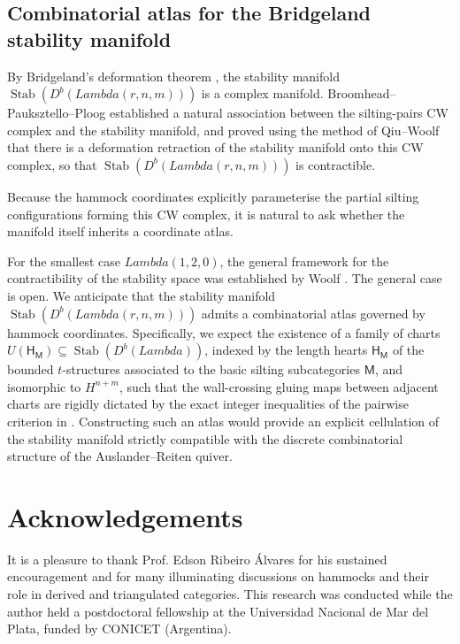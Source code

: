 \documentclass[11pt, a4paper]{article}
\theoremstyle{definition}
\def\Lambda{Lambda}%
\def\mathbb#1{#1}%
\def\mathcal#1{#1}%
\def\Db{D^b}%
\newcommand{\Db}{\mathcal{D}^b}
\begin{document}
\subsection{Combinatorial atlas for the Bridgeland stability manifold}
\label{subsec:future-stability}

By Bridgeland's deformation theorem \cite{Bridgeland2007}, the stability manifold $\operatorname{Stab}(\Db(\Lambda(r,n,m)))$ is a complex manifold. Broomhead--Pauksztello--Ploog \cite{BPP2016} established a natural association between the silting-pairs CW complex and the stability manifold, and proved using the method of Qiu--Woolf \cite{QW2018} that there is a deformation retraction of the stability manifold onto this CW complex, so that $\operatorname{Stab}(\Db(\Lambda(r,n,m)))$ is contractible.

Because the hammock coordinates explicitly parameterise the partial silting configurations forming this CW complex, it is natural to ask whether the manifold itself inherits a coordinate atlas.

For the smallest case $\Lambda(1,2,0)$, the general framework for the contractibility of the stability space was established by Woolf \cite{Woolf2010}. The general case is open. We anticipate that the stability manifold $\operatorname{Stab}(\Db(\Lambda(r,n,m)))$ admits a combinatorial atlas governed by hammock coordinates. Specifically, we expect the existence of a family of charts $U(\mathsf H_{\mathsf M}) \subseteq \operatorname{Stab}(\Db(\Lambda))$, indexed by the length hearts $\mathsf H_{\mathsf M}$ of the bounded $t$-structures associated to the basic silting subcategories $\mathsf M$, and isomorphic to $\mathbb H^{n+m}$, such that the wall-crossing gluing maps between adjacent charts are rigidly dictated by the exact integer inequalities of the pairwise criterion in . Constructing such an atlas would provide an explicit cellulation of the stability manifold strictly compatible with the discrete combinatorial structure of the Auslander--Reiten quiver.

\section*{Acknowledgements}
It is a pleasure to thank Prof. Edson Ribeiro \'Alvares for his sustained encouragement 
and for many illuminating discussions on hammocks and their role in derived and 
triangulated categories. This research was conducted while the author held a 
postdoctoral fellowship at the Universidad Nacional de Mar del Plata, funded by 
CONICET (Argentina).
\end{document}
